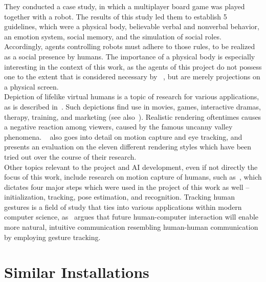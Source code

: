 \documentclass[draft,final]{vutinfth} %
\begin{document}
They conducted a case study, in which a multiplayer board game was played together with a robot. 
The results of this study led them to establish 5 guidelines, which were a physical body, believable verbal and nonverbal behavior, an emotion system, social memory, and the simulation of social roles.
Accordingly, agents controlling robots must adhere to those rules, to be realized as a social presence by humans. 
The importance of a physical body is especially interesting in the context of this work, as the agents of this project do not possess one to the extent that is considered necessary by ~\cite{pereira2014improving}, but are merely projections on a physical screen. \\
Depiction of lifelike virtual humans is a topic of research for various applications, as is described in~\cite{mcdonnell2012render}. 
Such depictions find use in movies, games, interactive dramas, therapy, training, and marketing (see also~\cite{gratch2002creating}). 
Realistic rendering oftentimes causes a negative reaction among viewers, caused by the famous uncanny valley phenomena. 
~\cite{mcdonnell2012render} also goes into detail on motion capture and eye tracking, and presents an evaluation on the eleven different rendering styles which have been tried out over the course of their research. \\
Other topics relevant to the project and AI development, even if not directly the focus of this work, include research on motion capture of humans, such as~\cite{moeslund2006survey}, which dictates four major steps which were used in the project of this work as well – initialization, tracking, pose estimation, and recognition. 
Tracking human gestures is a field of study that ties into various applications within modern computer science, as~\cite{wachs2011vision} argues that future human-computer interaction will enable more natural, intuitive communication resembling human-human communication by employing gesture tracking.

\section{Similar Installations}
\label{chap:similarinstallations}
\end{document}
